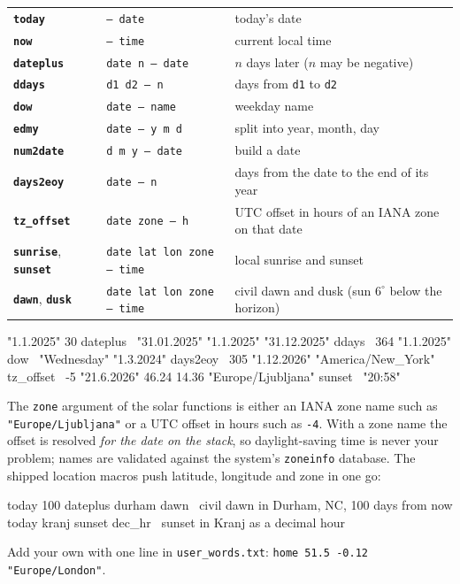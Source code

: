 \documentclass[11pt,letterpaper]{article}
\newcommand{\code}[1]{\texttt{#1}}
\newcommand{\cmd}[1]{\texttt{\textbf{#1}}}
\newcommand{\stk}[1]{\texttt{#1}}
\begin{document}
\begin{center}
\begin{tabular}{@{}llp{}@{}}
\toprule
\cmd{today}     & \stk{-- date}      & today's date \\
\cmd{now}       & \stk{-- time}      & current local time \\
\cmd{dateplus}  & \stk{date n -- date} & $n$ days later ($n$ may be negative) \\
\cmd{ddays}     & \stk{d1 d2 -- n}   & days from \code{d1} to \code{d2} \\
\cmd{dow}       & \stk{date -- name} & weekday name \\
\cmd{edmy}      & \stk{date -- y m d} & split into year, month, day \\
\cmd{num2date}  & \stk{d m y -- date} & build a date \\
\cmd{days2eoy}  & \stk{date -- n}    & days from the date to the end of its year \\
\cmd{tz\_offset} & \stk{date zone -- h} & UTC offset in hours of an IANA zone on that date \\
\cmd{sunrise}, \cmd{sunset} & \stk{date lat lon zone -- time} & local sunrise and sunset \\
\cmd{dawn}, \cmd{dusk} & \stk{date lat lon zone -- time} & civil dawn and dusk (sun $6^\circ$ below the horizon) \\
\bottomrule
\end{tabular}
\end{center}
\begin{rpn}
"1.1.2025" 30 dateplus         \ "31.01.2025"
"1.1.2025" "31.12.2025" ddays  \ 364
"1.1.2025" dow                 \ "Wednesday"
"1.3.2024" days2eoy            \ 305
"1.12.2026" "America/New_York" tz_offset        \ -5
"21.6.2026" 46.24 14.36 "Europe/Ljubljana" sunset   \ "20:58"
\end{rpn}
The \code{zone} argument of the solar functions is either an IANA zone name such as \code{"Europe/Ljubljana"} or a UTC offset in hours such as \code{-4}. With a zone name the offset is resolved \emph{for the date on the stack}, so daylight-saving time is never your problem; names are validated against the system's \code{zoneinfo} database. The shipped location macros push latitude, longitude and zone in one go:
\begin{rpn}
today 100 dateplus durham dawn      \ civil dawn in Durham, NC, 100 days from now
today kranj sunset dec_hr           \ sunset in Kranj as a decimal hour
\end{rpn}
Add your own with one line in \code{user\_words.txt}: \code{home 51.5 -0.12 "Europe/London"}.
\end{document}
